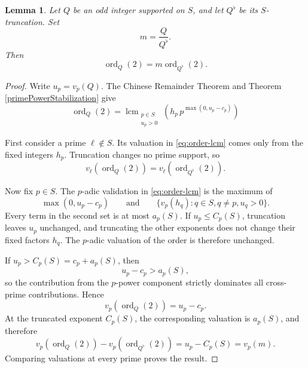 \documentclass[a4paper]{article}
\newtheorem{lemma}[theorem]{Lemma}
\newcommand{\ord}[2][]{\operatorname{ord}_{#1}\!\left( #2 \right)}
\begin{document}
	\begin{lemma}\label{orderGrowthTruncation}
		Let $Q$ be an odd integer supported on $S$, and let $Q^\flat$ be its $S$-truncation.
		Set
		\begin{equation*}
			m = \frac{Q}{Q^\flat}.
		\end{equation*}
		Then
		\begin{equation*}
			\ord[Q]{2} = m \ord[Q^\flat]{2}.
		\end{equation*}
	\end{lemma}
	\begin{proof}
		Write $u_p = v_p(Q)$.
		The Chinese Remainder Theorem and Theorem \ref{primePowerStabilization} give
		\begin{equation}\label{eq:order-lcm}
			\ord[Q]{2} = \mathop{\operatorname{lcm}}_{\substack{p\in S\\ u_p>0}}
			\left(h_p\,p^{\max(0,u_p-c_p)}\right)
		\end{equation}
		
		First consider a prime $\ell \notin S$.
		Its valuation in \eqref{eq:order-lcm} comes only from the fixed integers $h_p$.
		Truncation changes no prime support, so
		\begin{equation*}
			v_\ell(\ord[Q]{2}) = v_\ell(\ord[Q^\flat]{2}).
		\end{equation*}
	
		Now fix $p \in S$.
		The $p$-adic validation in \eqref{eq:order-lcm} is the maximum of
		\begin{equation*}
			\max{(0, u_p - c_p)} \qquad \text{and} \qquad \{v_p(h_q) : q \in S, q\neq p, u_q > 0\}.
		\end{equation*}
		Every term in the second set is at most $a_p(S)$.
		If $u_p \leq C_p(S)$, truncation leaves $u_p$ unchanged, and truncating the other exponents does not change their fixed factors $h_q$.
		The $p$-adic valuation of the order is therefore unchanged.
		
		If $u_p > C_p(S) = c_p + a_p(S)$, then
		\begin{equation*}
			u_p - c_p > a_p(S),
		\end{equation*}
		so the contribution from the $p$-power component strictly dominates all cross-prime contributions.
		Hence
		\begin{equation*}
			v_p(\ord[Q]{2}) = u_p - c_p.
		\end{equation*}
		At the truncated exponent $C_p(S)$, the corresponding valuation is $a_p(S)$, and therefore
		\begin{equation*}
			v_p(\ord[Q]{2}) - v_p(\ord[Q^\flat]{2}) = u_p - C_p(S) = v_p(m).
		\end{equation*}
		Comparing valuations at every prime proves the result.
	\end{proof}
	
\end{document}
